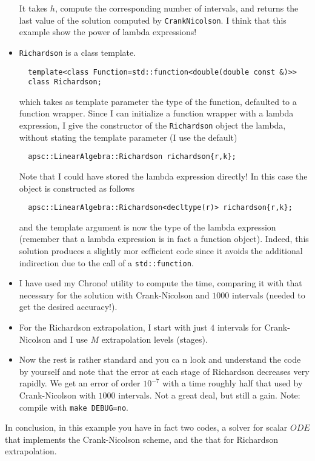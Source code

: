 \documentclass[10pt,a4paper,twoside]{article}
\begin{document}
\begin{itemize}
\begin{lstlisting}
\end{lstlisting}
It takes $h$, compute the corresponding number of intervals, and returns the last value of the solution computed by \lstinline!CrankNicolson!.
I think that this example show the power of lambda expressions!
\item \lstinline!Richardson! is a class template.
\begin{lstlisting}
  template<class Function=std::function<double(double const &)>>
  class Richardson;
\end{lstlisting}
  which takes as template parameter the type of the function, defaulted to a function wrapper. Since I can initialize a function wrapper with a lambda expression, I give the constructor of the \lstinline!Richardson! object the lambda, without stating the template parameter (I use the default)
\begin{lstlisting}
  apsc::LinearAlgebra::Richardson richardson{r,k};
\end{lstlisting}
  Note that I could have stored the lambda expression directly! In this case the object is constructed as follows
\begin{lstlisting}
  apsc::LinearAlgebra::Richardson<decltype(r)> richardson{r,k};
\end{lstlisting}
  and the template argument is now the type of the lambda expression (remember that a lambda expression is in fact a function object). Indeed, this solution produces a slightly mor eefficient code since it avoids the additional indirection due to the call of a \lstinline!std::function!.
\item I have used my \!Chrono! utility to compute the time, comparing it with that necessary for the solution with Crank-Nicolson
  and $1000$ intervals (needed to get the desired accuracy!).
  \item For the Richardson extrapolation, I start with just $4$ intervals for Crank-Nicolson and I use $M$ extrapolation levels (stages). 
  \item Now the rest is rather standard and you ca
   n look and understand the code by yourself and note that the error at each stage of Richardson decreases very rapidly. We get an error of order $10^{-7}$ with a time roughly half that used by Crank-Nicolson with $1000$ intervals. Not a great deal, but still a gain. Note: compile with \verb!make DEBUG=no!.
\end{itemize}

In conclusion, in this example you have in fact two codes, a solver for scalar $ODE$ that implements the Crank-Nicolson scheme, and the that for Richardson extrapolation.
\end{document}

